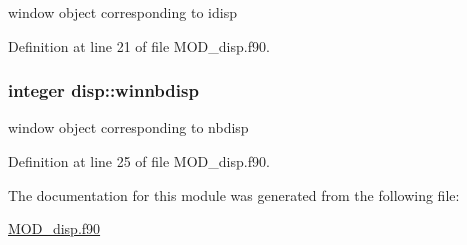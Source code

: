 window object corresponding to idisp 



Definition at line 21 of file M\-O\-D\-\_\-disp.\-f90.

\hypertarget{classdisp_ade4be59b02f8bc365b1af045f304bf87}{
\subsubsection[{winnbdisp}]{\setlength{\rightskip}{0pt plus 5cm}integer disp\-::winnbdisp}}\label{classdisp_ade4be59b02f8bc365b1af045f304bf87}


window object corresponding to nbdisp 



Definition at line 25 of file M\-O\-D\-\_\-disp.\-f90.



The documentation for this module was generated from the following file\-:\begin{DoxyCompactItemize}
\item 
\hyperlink{MOD__disp_8f90}{M\-O\-D\-\_\-disp.\-f90}\end{DoxyCompactItemize}
